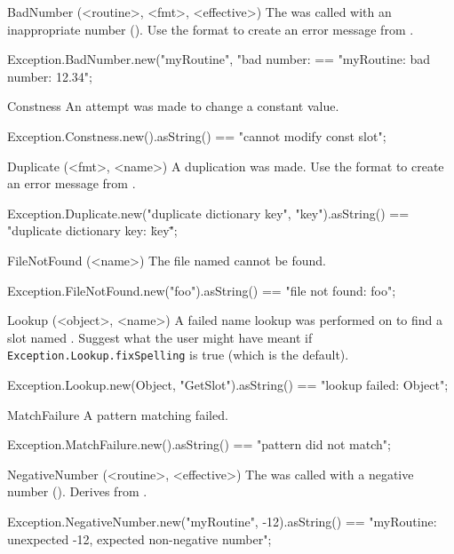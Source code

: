 \begin{urbiscriptapi}
\item[BadNumber](<routine>, <fmt>, <effective>)%
  The  was called with an inappropriate number
  ().  Use the format  to create an error
  message from .
\begin{urbiassert}
Exception.BadNumber.new("myRoutine", "bad number: %
  == "myRoutine: bad number: 12.34";
\end{urbiassert}


\item[Constness]%
  An attempt was made to change a constant value.
\begin{urbiassert}
Exception.Constness.new().asString()
  == "cannot modify const slot";
\end{urbiassert}


\item[Duplicate](<fmt>, <name>)%
  A duplication was made. Use the format  to
  create an error message from .
\begin{urbiassert}
Exception.Duplicate.new("duplicate dictionary key", "key").asString()
  == "duplicate dictionary key: \"key\"";
\end{urbiassert}


\item[FileNotFound](<name>)%
  The file named  cannot be found.
\begin{urbiassert}
Exception.FileNotFound.new("foo").asString()
  == "file not found: foo";
\end{urbiassert}


\item[Lookup](<object>, <name>)%
  A failed name lookup was performed on  to find a slot named
  .  Suggest what the user might have meant if
  \lstinline|Exception.Lookup.fixSpelling| is true (which is the default).
\begin{urbiassert}
Exception.Lookup.new(Object, "GetSlot").asString()
  == "lookup failed: Object";
\end{urbiassert}


\item[MatchFailure]%
  A pattern matching failed.
\begin{urbiassert}
Exception.MatchFailure.new().asString()
  == "pattern did not match";
\end{urbiassert}


\item[NegativeNumber](<routine>, <effective>)%
  The  was called with a negative number
  ().  Derives from .
\begin{urbiassert}
Exception.NegativeNumber.new("myRoutine", -12).asString()
== "myRoutine: unexpected -12, expected non-negative number";
\end{urbiassert}



\end{urbiscriptapi}
